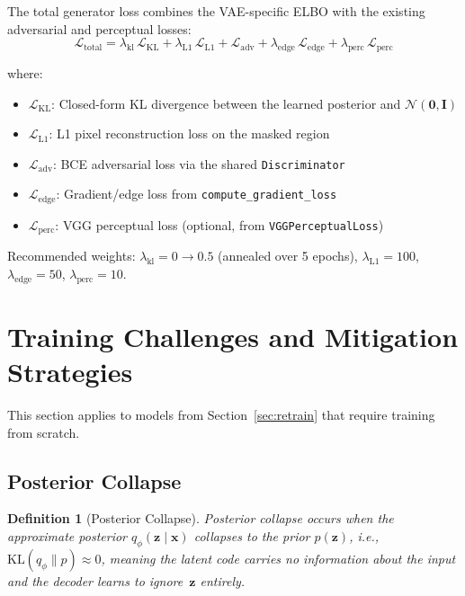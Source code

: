\documentclass[11pt, a4paper]{article}
\newtheorem{definition}{Definition}
\newcommand{\loss}{\mathcal{L}}
\newcommand{\KL}{\mathrm{KL}}
\newcommand{\N}{\mathcal{N}}
\begin{document}
The total generator loss combines the VAE-specific ELBO with the existing adversarial and perceptual losses:
\begin{equation}
  \boxed{
    \loss_{\text{total}} = \lambda_{\text{kl}}\, \loss_{\text{KL}}
                        + \lambda_{\text{L1}}\, \loss_{\text{L1}}
                        + \loss_{\text{adv}}
                        + \lambda_{\text{edge}}\, \loss_{\text{edge}}
                        + \lambda_{\text{perc}}\, \loss_{\text{perc}}
  }
  \label{eq:total_loss}
\end{equation}

where:
\begin{itemize}[leftmargin=1.5em]
  \item \(\loss_{\text{KL}}\): Closed-form KL divergence between the learned posterior and $\N(\mathbf{0}, \mathbf{I})$
  \item \(\loss_{\text{L1}}\): L1 pixel reconstruction loss on the masked region
  \item \(\loss_{\text{adv}}\): BCE adversarial loss via the shared \texttt{Discriminator}
  \item \(\loss_{\text{edge}}\): Gradient/edge loss from \texttt{compute\_gradient\_loss}
  \item \(\loss_{\text{perc}}\): VGG perceptual loss (optional, from \texttt{VGGPerceptualLoss})
\end{itemize}

Recommended weights: \(\lambda_{\text{kl}} = 0 \to 0.5\) (annealed over 5 epochs), \(\lambda_{\text{L1}} = 100\), \(\lambda_{\text{edge}} = 50\), \(\lambda_{\text{perc}} = 10\).


\section{Training Challenges and Mitigation Strategies}
\label{sec:challenges}

This section applies to models from Section~\ref{sec:retrain} that require training from scratch.

\subsection{Posterior Collapse}

\begin{definition}[Posterior Collapse]
Posterior collapse occurs when the approximate posterior $q_\phi(\mathbf{z} \mid \mathbf{x})$ collapses to the prior $p(\mathbf{z})$, i.e., $\KL(q_\phi \| p) \approx 0$, meaning the latent code carries no information about the input and the decoder learns to ignore~$\mathbf{z}$ entirely.
\end{definition}
\end{document}
